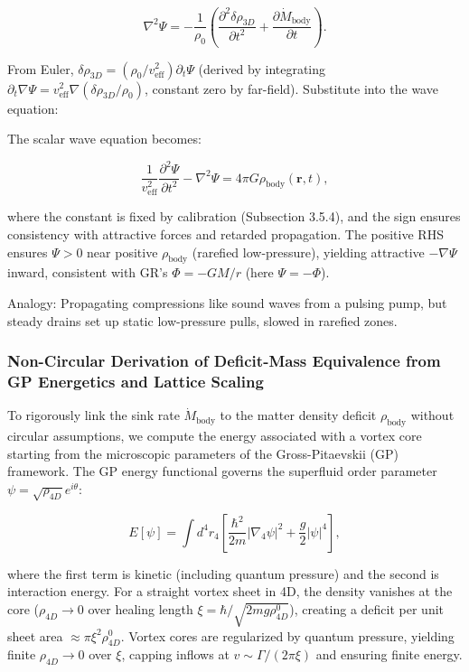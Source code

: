 \documentclass{article}
\begin{document}
\[
\nabla^2 \Psi = -\frac{1}{\rho_0} \left( \frac{\partial^2 \delta \rho_{3D}}{\partial t^2} + \frac{\partial \dot{M}_{\text{body}}}{\partial t} \right).
\]

From Euler, $\delta \rho_{3D} = (\rho_0 / v_{\text{eff}}^2) \partial_t \Psi$ (derived by integrating $\partial_t \nabla \Psi = v_{\text{eff}}^2 \nabla (\delta \rho_{3D} / \rho_0)$, constant zero by far-field). Substitute into the wave equation:

The scalar wave equation becomes:

\[
\frac{1}{v_{\text{eff}}^2} \frac{\partial^2 \Psi}{\partial t^2} - \nabla^2 \Psi = 4\pi G \rho_{\text{body}}(\mathbf{r}, t),
\]

where the constant is fixed by calibration (Subsection 3.5.4), and the sign ensures consistency with attractive forces and retarded propagation. The positive RHS ensures $\Psi > 0$ near positive $\rho_{\text{body}}$ (rarefied low-pressure), yielding attractive $-\nabla \Psi$ inward, consistent with GR's $\Phi = -GM/r$ (here $\Psi = -\Phi$).

Analogy: Propagating compressions like sound waves from a pulsing pump, but steady drains set up static low-pressure pulls, slowed in rarefied zones.

\subsubsection{Non-Circular Derivation of Deficit-Mass Equivalence from GP Energetics and Lattice Scaling}

To rigorously link the sink rate $\dot{M}_{\text{body}}$ to the matter density deficit $\rho_{\text{body}}$ without circular assumptions, we compute the energy associated with a vortex core starting from the microscopic parameters of the Gross-Pitaevskii (GP) framework. The GP energy functional governs the superfluid order parameter $\psi = \sqrt{\rho_{4D}} e^{i \theta}$:

\[
E[\psi] = \int d^4 r_4 \left[ \frac{\hbar^2}{2 m} |\nabla_4 \psi|^2 + \frac{g}{2} |\psi|^4 \right],
\]

where the first term is kinetic (including quantum pressure) and the second is interaction energy. For a straight vortex sheet in 4D, the density vanishes at the core ($\rho_{4D} \to 0$ over healing length $\xi = \hbar / \sqrt{2 m g \rho_{4D}^0}$), creating a deficit per unit sheet area $\approx \pi \xi^2 \rho_{4D}^0$. Vortex cores are regularized by quantum pressure, yielding finite $\rho_{4D} \to 0$ over $\xi$, capping inflows at $v \sim \Gamma / (2\pi \xi)$ and ensuring finite energy.
\end{document}
